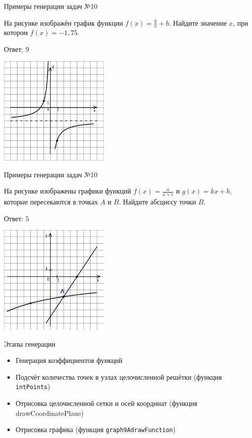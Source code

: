 \documentclass[aspectratio=169]{beamer}
\begin{document}
\begin{frame}{Примеры генерации задач №10}
    \begin{multicols}{2}
        На рисунке изображён график функции $f(x)=\frac{k}{x}+b$. Найдите значение $x$, при котором $f(x)=-1,75$.

        Ответ: $9$

        \includegraphics[width=0.4\textwidth]{images/5535657652049n0.png}
    \end{multicols}
    
\end{frame}

\begin{frame}{Примеры генерации задач №10}
    \begin{multicols}{2}
        На рисунке изображены графики функций $f(x)=\frac{a}{x+c}$ и $g(x)=kx+b$, которые пересекаются в точках $A$ и $B$. Найдите абсциссу точки $B$.

        Ответ: $5$

        \includegraphics[width=0.4\textwidth]{images/17222136364202n0.png}
    \end{multicols}
    

\end{frame}

\begin{frame}{Этапы генерации}
    \begin{itemize}
        \item Генерация коэффициентов функций
        \item Подсчёт количества точек в узлах целочисленной решётки (функция \texttt{intPoints})
        \item Отрисовка целочисленной сетки и осей координат (функция drawCoordinatePlane)
        \item Отрисовка графика (функция \texttt{graph9AdrawFunction})
    \end{itemize}
    
\end{frame}
\end{document}
